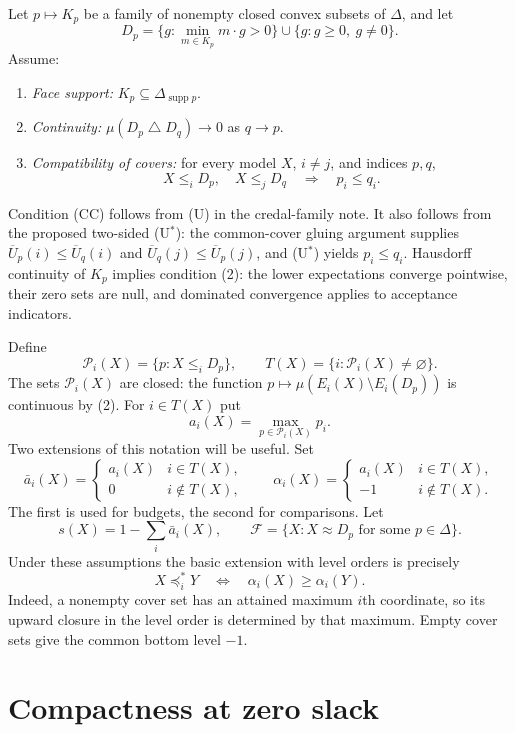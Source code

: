 \documentclass[11pt]{article}
\theoremstyle{remark}
\newcommand{\supp}{\operatorname{supp}}
\newcommand{\sd}{\mathbin{\triangle}}
\newcommand{\Pc}{\mathcal P}
\newcommand{\F}{\mathcal F}
\begin{document}
Let $p\mapsto K_p$ be a family of nonempty closed convex subsets of $\Delta$,
and let
\[
 D_p=\{g:\min_{m\in K_p}m\cdot g>0\}\cup\{g:g\ge0,\ g\ne0\}.
\]
Assume:
\begin{enumerate}[label=\textbf{(\arabic*)},leftmargin=*]
\item \emph{Face support:} $K_p\subseteq\Delta_{\supp p}$.
\item \emph{Continuity:} $\mu(D_p\sd D_q)\to0$ as $q\to p$.
\item \emph{Compatibility of covers:} for every model $X$, $i\ne j$, and
indices $p,q$,
\[
 X\le_iD_p,\quad X\le_jD_q\quad\Longrightarrow\quad p_i\le q_i.
 \tag{CC}\label{eq:cc}
\]
\end{enumerate}
Condition (CC) follows from (U) in the credal-family note. It also follows from
the proposed two-sided (U$^*$): the common-cover gluing argument supplies
$\overline U_p(i)\le\overline U_q(i)$ and
$\overline U_q(j)\le\overline U_p(j)$, and (U$^*$) yields $p_i\le q_i$.
Hausdorff continuity of $K_p$ implies condition (2): the lower expectations
converge pointwise, their zero sets are null, and dominated convergence applies
to acceptance indicators.

Define
\[
 \Pc_i(X)=\{p:X\le_iD_p\},\qquad
 T(X)=\{i:\Pc_i(X)\ne\varnothing\}.
\]
The sets $\Pc_i(X)$ are closed: the function
$p\mapsto\mu(E_i(X)\setminus E_i(D_p))$ is continuous by (2).
For $i\in T(X)$ put
\[
 a_i(X)=\max_{p\in\Pc_i(X)}p_i.
\]
Two extensions of this notation will be useful. Set
\[
 \bar a_i(X)=\begin{cases}a_i(X)&i\in T(X),\\0&i\notin T(X),\end{cases}
 \qquad
 \alpha_i(X)=\begin{cases}a_i(X)&i\in T(X),\\-1&i\notin T(X).\end{cases}
\]
The first is used for budgets, the second for comparisons. Let
\[
 s(X)=1-\sum_i\bar a_i(X),\qquad
 \F=\{X:X\approx D_p\text{ for some }p\in\Delta\}.
\]
Under these assumptions the basic extension with level orders is precisely
\[
 X\preceq_i^*Y\quad\Longleftrightarrow\quad
 \alpha_i(X)\ge\alpha_i(Y).
 \tag{*}\label{eq:basicorder}
\]
Indeed, a nonempty cover set has an attained maximum $i$th coordinate, so its
upward closure in the level order is determined by that maximum. Empty cover
sets give the common bottom level $-1$.

\section{Compactness at zero slack}
\end{document}
